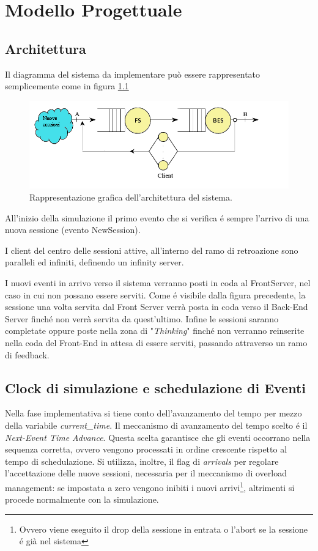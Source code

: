 \chapter{Modello Progettuale}
	\label{cap:modelloprogettuale}

\section{Architettura}
Il diagramma del sistema da implementare pu\`o essere 
rappresentato semplicemente come in figura \ref{fig:architettura}
\begin{figure}[H]
	\centering
	\includegraphics[scale=0.7]{img/architettura.png}
	\caption[Architettura del sistema]{Rappresentazione grafica 
dell'architettura del sistema.}
	\label{fig:architettura}
	\end{figure}
All'inizio della simulazione il primo evento che si verifica \'e sempre l'arrivo 
di una nuova sessione (evento NewSession).

\vspace{0.5cm}I client del centro delle sessioni attive, all'interno del ramo di 
retroazione sono paralleli ed infiniti, definendo un infinity server.

\vspace{0.5cm}I nuovi eventi in arrivo verso il sistema verranno 
posti in coda al FrontServer, nel caso in cui non possano essere serviti. Come 
\'e visibile dalla figura precedente, la sessione una volta servita dal 
Front Server verr\`a posta in coda verso il Back-End Server finch\'e non verr\`a 
servita da quest'ultimo. Infine le sessioni saranno completate oppure poste 
nella zona di "\textit{Thinking}" finch\'e non verranno reinserite nella coda 
del Front-End in attesa di essere serviti, passando attraverso un ramo di 
feedback.
 
\section{Clock di simulazione e schedulazione di  Eventi}
Nella fase implementativa si tiene conto dell'avanzamento del tempo per mezzo 
della variabile \textit{current\_time}. Il meccanismo di avanzamento del tempo 
scelto \'e il \textit{Next-Event Time Advance}. Questa scelta garantisce che gli 
eventi occorrano nella sequenza corretta, ovvero vengono processati in ordine 
crescente rispetto al tempo di schedulazione. Si utilizza, inoltre, il flag di 
\textit{arrivals} per regolare l'accettazione delle nuove sessioni, necessaria per il meccanismo di overload management: se impostata 
a zero vengono inibiti i nuovi arrivi\footnote{Ovvero viene eseguito il drop 
della sessione in entrata o l'abort se la sessione \'e gi\`a nel sistema}, 
altrimenti si procede normalmente con la simulazione.

